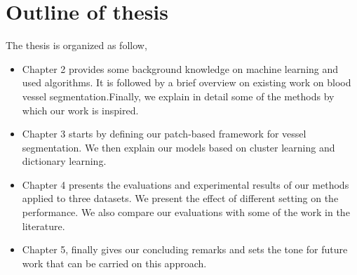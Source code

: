 \section{Outline of thesis}
The thesis is organized as follow,
\begin{itemize}
	\item Chapter 2 provides some background knowledge on machine learning and used algorithms. It is followed by a brief overview on existing work on blood vessel segmentation.Finally, we explain in detail some of the methods by which our work is inspired.
	\item Chapter 3 starts by defining our patch-based framework for vessel segmentation. We then explain our models based on cluster learning and dictionary learning.
	\item Chapter 4 presents the evaluations and experimental results of our methods applied to three datasets. We present the effect of different setting on the performance. We also compare our evaluations with some of the work in the literature.
	\item Chapter 5, finally gives our concluding remarks and sets the tone for future work that can be carried on this approach. 
\end{itemize}
